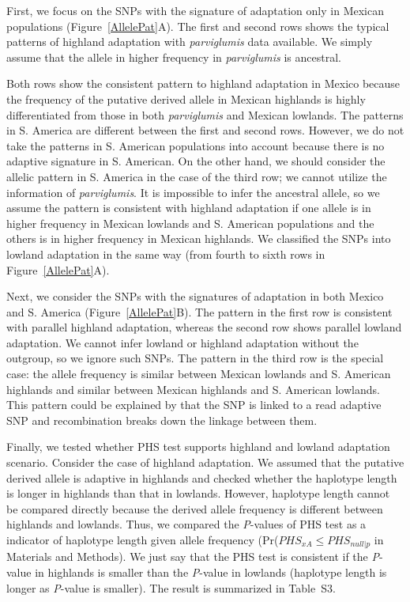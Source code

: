 First, we focus on the SNPs with the signature of adaptation only in Mexican populations (Figure~\ref{AllelePat}A).  
The first and second rows shows the typical patterns of highland adaptation with \emph{parviglumis} data available.
We simply assume that the allele in higher frequency in \emph{parviglumis} is ancestral.

Both rows show the consistent pattern to highland adaptation in Mexico because the frequency of the putative derived allele in Mexican highlands is highly differentiated from those in both \emph{parviglumis} and Mexican lowlands.
The patterns in S. America are different between the first and second rows.
However, we do not take the patterns in S. American populations into account because there is no adaptive signature in S. American.
On the other hand, we should consider the allelic pattern in S. America in the case of the third row; we cannot utilize the information of \emph{parviglumis}.
It is impossible to infer the ancestral allele, so we assume the pattern is consistent with highland adaptation if one allele is in higher frequency in Mexican lowlands and S. American populations and the others is in higher frequency in Mexican highlands.
We classified the SNPs into lowland adaptation in the same way (from fourth to sixth rows in Figure~\ref{AllelePat}A).

Next, we consider the SNPs with the signatures of adaptation in both Mexico and S. America (Figure~\ref{AllelePat}B).
The pattern in the first row is consistent with parallel highland adaptation, whereas the second row shows parallel lowland adaptation. 
We cannot infer lowland or highland adaptation without the outgroup, so we ignore such SNPs.
The pattern in the third row is the special case: the allele frequency is similar between Mexican lowlands and S. American highlands and similar between Mexican highlands and S. American lowlands.
This pattern could be explained by that the SNP is linked to a read adaptive SNP and recombination breaks down the linkage between them.

Finally, we tested whether PHS test supports highland and lowland adaptation scenario.
Consider the case of highland adaptation.
We assumed that the putative derived allele is adaptive in highlands and checked whether the haplotype length is longer in highlands than that in lowlands.
However, haplotype length cannot be compared directly because the derived allele frequency is different between highlands and lowlands.
Thus, we compared the \emph{P}-values of PHS test as a indicator of haplotype length given allele frequency (Pr($PHS_{xA}\leq PHS_{null|p}$ in Materials and Methods).
We just say that the PHS test is consistent if the \emph{P}-value in highlands is smaller than the \emph{P}-value in lowlands (haplotype length is longer as \emph{P}-value is smaller).
The result is summarized in Table~S3.



